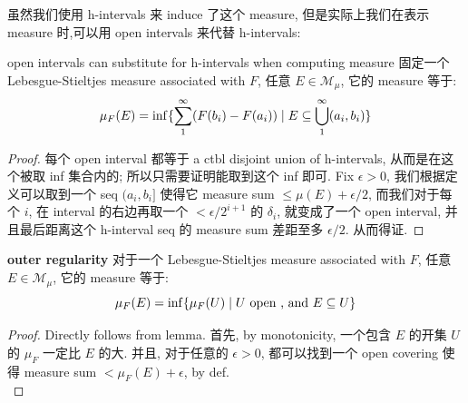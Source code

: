 \documentclass[lang=cn,11pt]{elegantbook}
\begin{document}
虽然我们使用 h-intervals 来 induce 了这个 measure, 但是实际上我们在表示 measure 时,可以用 open intervals 来代替 h-intervals:
\begin{lemma}{open intervals can substitute for h-intervals when computing measure}
固定一个 Lebesgue-Stieltjes measure associated with $F$, 任意 $E \in \mathcal{M}_\mu$, 它的 measure 等于:$$
\mu_F(E) = \inf \{ \sum_1^\infty (F(b_i) - F(a_i))   \mid E \subseteq \bigcup_1^\infty (a_i, b_i)      \}
$$
\end{lemma}
\begin{proof}
    每个 open interval 都等于 a ctbl disjoint union of h-intervals, 从而是在这个被取 inf 集合内的; 所以只需要证明能取到这个 inf 即可.
    Fix $\epsilon > 0$, 我们根据定义可以取到一个 seq $(a_i, b_i]$ 使得它 measure sum $\leq \mu(E) + \epsilon /2$, 而我们对于每个 $i$, 在 interval 的右边再取一个 $ <\epsilon/2^{i+1}$ 的 $\delta_i$, 就变成了一个 open interval, 并且最后距离这个 h-interval seq 的 measure sum 差距至多 $\epsilon/2$. 从而得证.
\end{proof}


\begin{theorem}{\textbf{outer regularity}}
\label{outer regularity}
对于一个 Lebesgue-Stieltjes measure associated with $F$, 任意 $E \in \mathcal{M}_\mu$, 它的 measure 等于:
\begin{equation}
    \mu_F(E) = \inf \{ \mu_F(U) \mid  U \text{ open , and } E \subseteq U  \}
\end{equation}
\end{theorem}


\begin{proof}
    Directly follows from lemma. 首先, by monotonicity, 一个包含 $E$ 的开集 $U$ 的 $\mu_F$ 一定比 $E$ 的大. 并且, 对于任意的 $\epsilon > 0$, 都可以找到一个 open covering 使得 measure sum $< \mu_F(E) + \epsilon$, by def.\\
\end{proof}
\end{document}
